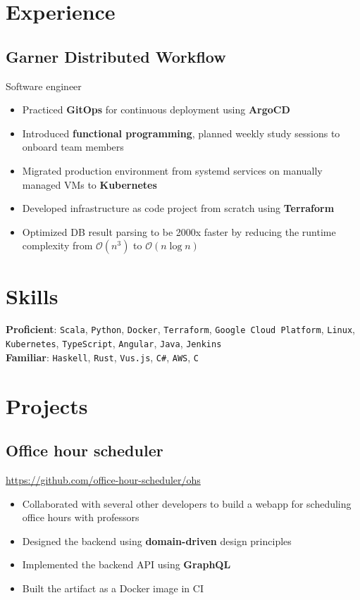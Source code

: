 \documentclass[letterpaper,12pt,oneside]{article}
\newcommand{\smallurl}[1]{\footnotesize{\url{#1}}\normalsize}
\begin{document}
\section*{Experience}
\subsection*{Garner Distributed Workflow \hfill {}}
Software engineer
\begin{itemize}
    \setlength\itemsep{0em}
    \item Practiced \textbf{GitOps} for continuous deployment using \textbf{ArgoCD}
    \item Introduced \textbf{functional programming}, planned weekly study sessions to onboard team members
    \item Migrated production environment from systemd services on manually managed VMs to \textbf{Kubernetes}
    \item Developed infrastructure as code project from scratch using \textbf{Terraform}
    \item Optimized DB result parsing to be 2000x faster by reducing the runtime complexity from $\mathcal{O}(n^3)$ to $\mathcal{O}(n\log{}n)$
\end{itemize}

\section*{Skills}
\large{}
\textbf{Proficient}:
\texttt{Scala}, \texttt{Python}, \texttt{Docker}, \texttt{Terraform}, \texttt{Google Cloud Platform}, \texttt{Linux},
\texttt{Kubernetes}, \texttt{TypeScript}, \texttt{Angular}, \texttt{Java}, \texttt{Jenkins} \\
\textbf{Familiar}:
\texttt{Haskell}, \texttt{Rust}, \texttt{Vus.js}, \texttt{C\#}, \texttt{AWS}, \texttt{C}
\normalsize{}

\section*{Projects}

\subsection*{Office hour scheduler \hfill {}}
\smallurl{https://github.com/office-hour-scheduler/ohs}
\begin{itemize}
    \setlength\itemsep{0em}
    \item Collaborated with several other developers to build a webapp for scheduling office hours with professors
    \item Designed the backend using \textbf{domain-driven} design principles
    \item Implemented the backend API using \textbf{GraphQL}
    \item Built the artifact as a Docker image in CI
\end{itemize}
\end{document}
